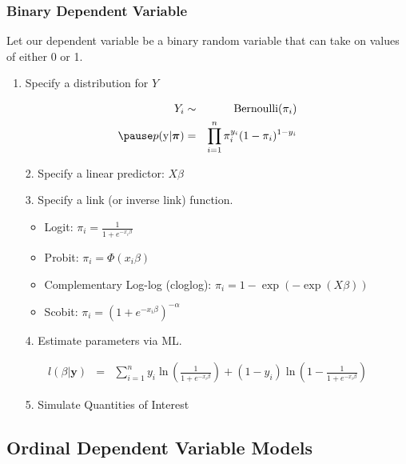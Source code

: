\documentclass{beamer}
\begin{document}
\begin{frame}
\frametitle{Binary Dependent Variable}
Let our dependent variable be a binary random variable that can take
on values of either 0 or 1.
\end{frame}

\begin{frame}
\begin{enumerate}
\item Specify a distribution for $Y$
\end{enumerate}
\pause
\begin{eqnarray*}
Y_i &\sim& \mathrm{Bernoulli}(\pi_i) \\
\pause
p(\mathrm{y} | \bm{\pi}) &=& \prod^n_{i=1} \pi_i^{y_i} (1-\pi_i)^{1-y_i}
\end{eqnarray*}
\pause
\begin{itemize}
\item[2.] Specify a linear predictor: \pause $X\beta$
\end{itemize}
\end{frame}

\begin{frame}
\begin{itemize}
\item[3.] Specify a link (or inverse link) function.
\pause
\begin{itemize}
\item Logit: $\pi_i = \frac{1}{1+e^{-x_i\beta}}$
\pause
\item Probit: $\pi_i = \Phi(x_i \beta)$
\pause
\item Complementary Log-log (cloglog): $\pi_i = 1 - \exp(-\exp(X\beta))$
\pause
\item Scobit: $\pi_i = (1+e^{-x_i \beta})^{-\alpha}$
\end{itemize}
\pause
\bigskip
\item[4.] Estimate parameters via ML.
\pause
\end{itemize}
\begin{eqnarray*}
l(\beta | \mathbf{y}) &=& \sum^n_{i=1} y_i \; \mathrm{ln} \,
\left(\frac{1}{1+e^{-x_i\beta}}\right) + (1-y_i) \; \mathrm{ln} \, \left(1-\frac{1}{1+e^{-x_i\beta}}\right)
\end{eqnarray*}
\pause
\begin{itemize}
\item[5.] Simulate Quantities of Interest
\end{itemize}
\end{frame}

\subsection{Ordinal Dependent Variable Models}
\end{document}
